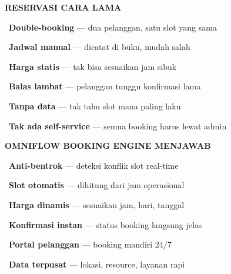 \documentclass[a4paper]{article}
\begin{document}
\noindent
\begin{minipage}[t]{0.485\textwidth}
    \colorbox{RedLight}{%
        \begin{minipage}{\dimexpr\textwidth-2\fboxsep\relax}
            {\fontsize{10}{13}\selectfont\bfseries\color{RedText} RESERVASI CARA LAMA}
        \end{minipage}}\par
    \vspace{4pt}

    {\fontsize{9.5}{13}\selectfont\color{TextDark}%
    \textbullet\ \textbf{Double-booking} --- dua pelanggan, satu slot yang sama\par\vspace{4pt}%
    \textbullet\ \textbf{Jadwal manual} --- dicatat di buku, mudah salah\par\vspace{4pt}%
    \textbullet\ \textbf{Harga statis} --- tak bisa sesuaikan jam sibuk\par\vspace{4pt}%
    \textbullet\ \textbf{Balas lambat} --- pelanggan tunggu konfirmasi lama\par\vspace{4pt}%
    \textbullet\ \textbf{Tanpa data} --- tak tahu slot mana paling laku\par\vspace{4pt}%
    \textbullet\ \textbf{Tak ada self-service} --- semua booking harus lewat admin}%
\end{minipage}%
\hfill%
\begin{minipage}[t]{0.485\textwidth}
    \colorbox{BluePrimary}{%
        \begin{minipage}{\dimexpr\textwidth-2\fboxsep\relax}
            {\fontsize{10}{13}\selectfont\bfseries\color{White} OMNIFLOW BOOKING ENGINE MENJAWAB}
        \end{minipage}}\par
    \vspace{4pt}

    {\fontsize{9.5}{13}\selectfont\color{TextDark}%
    \textbullet\ \textbf{Anti-bentrok} --- deteksi konflik slot real-time\par\vspace{4pt}%
    \textbullet\ \textbf{Slot otomatis} --- dihitung dari jam operasional\par\vspace{4pt}%
    \textbullet\ \textbf{Harga dinamis} --- sesuaikan jam, hari, tanggal\par\vspace{4pt}%
    \textbullet\ \textbf{Konfirmasi instan} --- status booking langsung jelas\par\vspace{4pt}%
    \textbullet\ \textbf{Portal pelanggan} --- booking mandiri 24/7\par\vspace{4pt}%
    \textbullet\ \textbf{Data terpusat} --- lokasi, resource, layanan rapi}%
\end{minipage}
\end{document}
